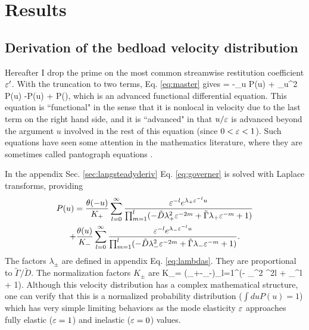 \section{Results}
\label{sec:langresults}

\subsection{Derivation of the bedload velocity distribution}
\label{sec:langsolution}
Hereafter I drop the prime on the most common streamwise restitution coefficient $\varepsilon'$.
With the truncation to two terms, Eq. \ref{eq:master} gives 
 = -\tilde{\Gamma}\partial_u P(u) + \partial_u^2 P(u) -P(u) +  P\big(\big),\label{eq:governer} \ee
which is an advanced functional differential equation. This equation is ``functional" in the sense that it is nonlocal in velocity due to the last term on the right hand side, and it is ``advanced" in that $u/\varepsilon$ is advanced beyond the argument $u$ involved in the rest of this equation (since $0<\varepsilon<1$).
Such equations have seen some attention in the mathematics literature, where they are sometimes called pantograph equations \citep{Hall1989, Kim1998,Zaidi2015}.

In the appendix Sec. \ref{sec:langsteadyderiv} Eq. \ref{eq:governer} is solved with Laplace transforms, providing
\begin{multline} P(u) = \frac{\theta(-u)}{K_+}\sum_{l=0}^\infty \frac{\varepsilon^{-l}e^{\lambda_+\varepsilon^{-l}u}}{\prod_{m=1}^l(-\tilde{D} \lambda_+^2 \varepsilon^{-2m} + \tilde{\Gamma} \lambda_+ \varepsilon^{-m} + 1) } 
	\\+ \frac{\theta(u)}{K_-}\sum_{l=0}^\infty \frac{\varepsilon^{-l}e^{\lambda_-\varepsilon^{-l}u}}{\prod_{m=1}^l(- \tilde{D} \lambda_-^2 \varepsilon^{-2m} + \tilde{\Gamma} \lambda_- \varepsilon^{-m} + 1) } \label{eq:steadystate}. \end{multline}
The factors $\lambda_\pm$ are defined in appendix Eq. \ref{eq:lambdas}. They are proportional to $\tilde{\Gamma}/\tilde{D}$. 
The normalization factors $K_\pm$ are 
\be K_\pm = (\lambda_+-\lambda_-)\prod_{l=1}^\infty (- \lambda_\pm^2 \ve^{2l} +\tilde{\Gamma} \lambda_\pm \ve^{l} + 1). \ee
Although this velocity distribution has a complex mathematical structure, one can verify that this is a normalized probability distribution ($\int du P(u) = 1$) which has very simple limiting behaviors as the mode elasticity $\varepsilon$ approaches fully elastic ($\varepsilon=1$) and inelastic ($\varepsilon = 0$) values.

